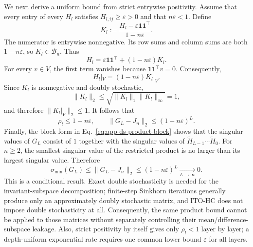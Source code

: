 \documentclass{article}
\begin{document}
We next derive a uniform bound from strict entrywise positivity. Assume that
every entry of every $H_l$ satisfies $H_{l,ij}\geq\varepsilon>0$ and that
$n\varepsilon<1$. Define
\begin{equation}
 K_l:=\frac{H_l-\varepsilon\mathbf 1\mathbf 1^\top}{1-n\varepsilon}.
 \label{eq:app-ds-positive-decomposition}
\end{equation}
The numerator is entrywise nonnegative. Its row sums and column sums are both
$1-n\varepsilon$, so $K_l\in\mathcal B_n$. Thus
\begin{equation}
 H_l=\varepsilon\mathbf 1\mathbf 1^\top+(1-n\varepsilon)K_l.
 \label{eq:app-ds-positive-reconstruction}
\end{equation}
For every $v\in V$, the first term vanishes because
$\mathbf 1\mathbf 1^\top v=0$. Consequently,
\begin{equation}
 H_l|_V=(1-n\varepsilon)K_l|_V.
 \label{eq:app-ds-positive-restriction}
\end{equation}
Since $K_l$ is nonnegative and doubly stochastic,
\[
 \|K_l\|_2
 \leq\sqrt{\|K_l\|_1\|K_l\|_\infty}=1,
\]
and therefore $\|K_l|_V\|_2\leq1$. It follows that
\begin{equation}
 \rho_l\leq1-n\varepsilon,
 \mspace{36mu}
 \|G_L-J_n\|_2\leq(1-n\varepsilon)^L.
 \label{eq:app-ds-uniform-bound}
\end{equation}
Finally, the block form in Eq.~\ref{eq:app-ds-product-block} shows that the
singular values of $G_L$ consist of $1$ together with the singular values of
$\widetilde H_{L-1}\cdots\widetilde H_0$. For $n\geq2$, the smallest singular
value of the restricted product is no larger than its largest singular value.
Therefore
\begin{equation}
 \sigma_{\min}(G_L)
 \leq \|G_L-J_n\|_2
 \leq (1-n\varepsilon)^L
 \xrightarrow[L\to\infty]{}0.
 \label{eq:app-ds-smin-bound}
\end{equation}
This is a conditional result. Exact double stochasticity is needed for the
invariant-subspace decomposition; finite-step Sinkhorn iterations generally
produce only an approximately doubly stochastic matrix, and ITO-HC does not
impose double stochasticity at all. Consequently, the same product bound
cannot be applied to those matrices without separately controlling their
mean/difference-subspace leakage. Also, strict positivity by itself gives only
$\rho_l<1$ layer by layer; a depth-uniform exponential rate requires one
common lower bound $\varepsilon$ for all layers.
\end{document}

